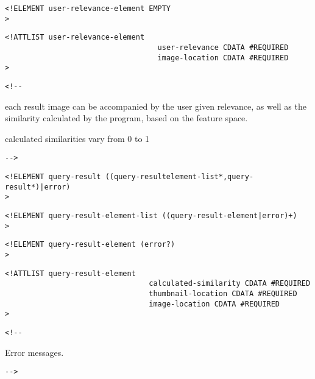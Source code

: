 \begin{verbatim}
<!ELEMENT user-relevance-element EMPTY 
>\end{verbatim}

\begin{verbatim}
<!ATTLIST user-relevance-element 
                                   user-relevance CDATA #REQUIRED
                                   image-location CDATA #REQUIRED
>\end{verbatim}

\begin{verbatim}<!--\end{verbatim}
  


     each result image can be accompanied by the user given relevance,
     as well as the similarity calculated by the program, based on the
     feature space.

     calculated similarities vary from 0 to 1

       
 \begin{verbatim}-->\end{verbatim}



\begin{verbatim}
<!ELEMENT query-result ((query-resultelement-list*,query-result*)|error) 
>\end{verbatim}

\begin{verbatim}
<!ELEMENT query-result-element-list ((query-result-element|error)+) 
>\end{verbatim}

\begin{verbatim}
<!ELEMENT query-result-element (error?) 
>\end{verbatim}

\begin{verbatim}
<!ATTLIST query-result-element 
                                 calculated-similarity CDATA #REQUIRED
                                 thumbnail-location CDATA #REQUIRED
                                 image-location CDATA #REQUIRED
>\end{verbatim}

\begin{verbatim}<!--\end{verbatim}
  

     Error messages.

       
 \begin{verbatim}-->\end{verbatim}



